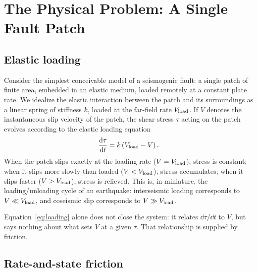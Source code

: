 \section{The Physical Problem: A Single Fault Patch}

\subsection{Elastic loading}

Consider the simplest conceivable model of a seismogenic fault: a single patch of finite area, embedded in an elastic medium, loaded remotely at a constant plate rate. We idealize the elastic interaction between the patch and its surroundings as a linear spring of stiffness $k$, loaded at the far-field rate $V_{\mathrm{load}}$. If $V$ denotes the instantaneous slip velocity of the patch, the shear stress $\tau$ acting on the patch evolves according to the elastic loading equation
\begin{equation}
\frac{\mathrm{d} \tau}{\mathrm{d} t} = k\left(V_{\mathrm{load}} - V\right).
\label{eq:loading}
\end{equation}
When the patch slips exactly at the loading rate ($V = V_{\mathrm{load}}$), stress is constant; when it slips more slowly than loaded ($V < V_{\mathrm{load}}$), stress accumulates; when it slips faster ($V > V_{\mathrm{load}}$), stress is relieved. This is, in miniature, the loading/unloading cycle of an earthquake: interseismic loading corresponds to $V \ll V_{\mathrm{load}}$, and coseismic slip corresponds to $V \gg V_{\mathrm{load}}$.

Equation~\eqref{eq:loading} alone does not close the system: it relates $\dd\tau/\dd t$ to $V$, but says nothing about what sets $V$ at a given $\tau$. That relationship is supplied by friction.

\subsection{Rate-and-state friction}

